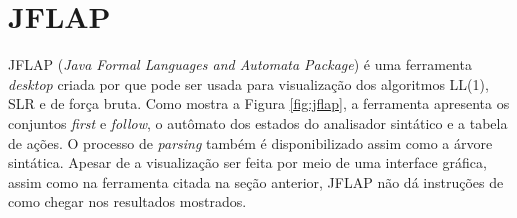 \section{JFLAP}
JFLAP (\textit{Java Formal Languages and Automata Package}) é uma ferramenta \textit{desktop} criada por \textcite{jflap} que pode ser usada para visualização dos algoritmos LL(1), SLR e de força bruta. Como mostra a Figura \ref{fig:jflap}, a ferramenta apresenta os conjuntos \textit{first} e \textit{follow}, o autômato dos estados do analisador sintático e a tabela de ações. O processo de \textit{parsing} também é disponibilizado assim como a árvore sintática. Apesar de a visualização ser feita por meio de uma interface gráfica, assim como na ferramenta citada na seção anterior, JFLAP não dá instruções de como chegar nos resultados mostrados.

\begin{figure}[t!]
    \captionsetup{width=16cm}
\end{figure}


